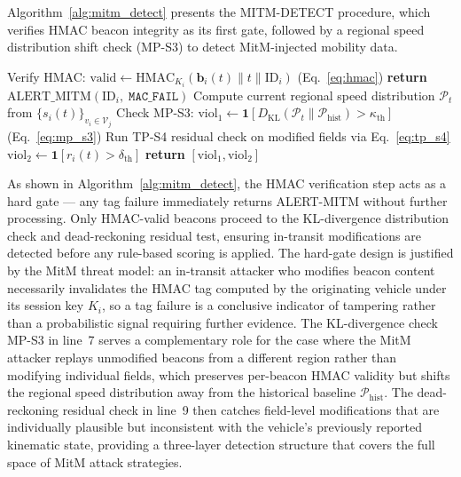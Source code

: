 \documentclass[12pt, a4paper]{report}
\begin{document}
Algorithm~\ref{alg:mitm_detect} presents the MITM-DETECT procedure,
which verifies HMAC beacon integrity as its first gate, followed by a
regional speed distribution shift check (MP-S3) to detect
MitM-injected mobility data.

\begin{algorithm}[H]
\caption{MitM Mobility Pattern Poisoning Detection (\texttt{MITM-DETECT})}
\begin{algorithmic}[1]
  \small
  \State Verify HMAC: $\mathrm{valid} \gets
    \mathrm{HMAC}_{K_i}(\mathbf{b}_i(t) \| t \| \mathrm{ID}_i)$
    \quad (Eq.~\eqref{eq:hmac})
    \State \textbf{return} $\mathrm{ALERT\_MITM}(\mathrm{ID}_i,\;
      \texttt{MAC\_FAIL})$
  \EndIf
  \State Compute current regional speed distribution $\mathcal{P}_t$
         from $\{s_i(t)\}_{v_i \in \mathcal{V}_j}$
  \State Check MP-S3: $\mathrm{viol}_1 \gets
    \mathbf{1}\!\left[D_{\mathrm{KL}}(\mathcal{P}_t \| \mathcal{P}_{\mathrm{hist}})
    > \kappa_{\mathrm{th}}\right]$
    \quad (Eq.~\eqref{eq:mp_s3})
  \State Run TP-S4 residual check on modified fields
         via Eq.~\eqref{eq:tp_s4}
  \State $\mathrm{viol}_2 \gets \mathbf{1}\!\left[r_i(t) > \delta_{\mathrm{th}}\right]$
\State \textbf{return}
    $[\mathrm{viol}_1,\mathrm{viol}_2]$
  \EndProcedure
\end{algorithmic}
\label{alg:mitm_detect}
\end{algorithm}

As shown in Algorithm~\ref{alg:mitm_detect}, the HMAC verification
step acts as a hard gate --- any tag failure immediately returns
ALERT-MITM without further processing. Only HMAC-valid beacons
proceed to the KL-divergence distribution check and dead-reckoning
residual test, ensuring in-transit modifications are detected before
any rule-based scoring is applied. The hard-gate design is justified
by the MitM threat model: an in-transit attacker who modifies beacon
content necessarily invalidates the HMAC tag computed by the
originating vehicle under its session key $K_i$, so a tag failure is
a conclusive indicator of tampering rather than a probabilistic signal
requiring further evidence. The KL-divergence check MP-S3 in line~7
serves a complementary role for the case where the MitM attacker
replays unmodified beacons from a different region rather than
modifying individual fields, which preserves per-beacon HMAC validity
but shifts the regional speed distribution away from the historical
baseline $\mathcal{P}_{\mathrm{hist}}$. The dead-reckoning residual
check in line~9 then catches field-level modifications that are
individually plausible but inconsistent with the vehicle's previously
reported kinematic state, providing a three-layer detection structure
that covers the full space of MitM attack strategies.
\end{document}
